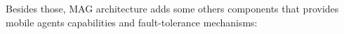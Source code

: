 \documentclass[times, 09pt, twocolumn]{article}
\begin{document}
%
%
%
%
%

Besides those, MAG architecture adds some others components that provides
mobile agents capabilities and fault-tolerance mechanisms:
\end{document}
